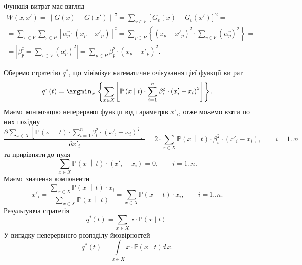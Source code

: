 Функція витрат має вигляд
\begin{equation*}
  \begin{split}
    W \left( x, x' \right)
    = \left\| G\left( x \right) - G\left( x' \right) \right\|^2
    = \sum_{v \in V} \left[
        G_v\left( x \right) - G_v\left( x' \right)
      \right]^2 = \\
    = \sum_{v \in V} \sum_{p \in P} \left[
        \alpha_p^v \cdot \left( x_p - x'_p \right)
      \right]^2
    = \sum_{p \in P} \left\{ \left( x_p - x'_p \right)^2
      \cdot \sum_{v \in V} \left( \alpha_p^v \right)^2 \right\} = \\
    = \left| \beta_p^2 = \sum_{v \in V} \left( \alpha_p^v \right)^2 \right|
    = \sum_{p \in P} \beta_p^2 \cdot \left( x_p - x'_p \right)^2.
  \end{split}
\end{equation*}

Оберемо стратегію $q^*$,
що мінімізує математичне очікування цієї функції витрат
\begin{equation*}
  q^* \left( t \right)
  = \argmin_{x'} \left\{
    \sum\limits_{x \in X} \left[
        \mathbb{P} \left( x \;\middle|\;  t \right)
        \cdot \sum_{i = 1}^n \beta_i^2 \cdot \left( x'_i - x_i \right)^2
      \right]
    \right\}.
\end{equation*}
Маємо мінімізацію неперервної функції від параметрів $x'_i$,
отже можемо взяти по них похідну
\begin{equation*}
  \frac{\partial \sum\limits_{x \in X} \left[
      \mathbb{P} \left( x \;\middle|\;  t \right)
      \cdot \sum\limits_{i = 1}^n \beta_i^2 \cdot \left( x'_i - x_i \right)^2
  \right]}{\partial x'_i}
  = 2 \cdot \sum_{x \in X} \mathbb{P} \left( x \;\middle|\;  t \right)
    \cdot \beta_i^2 \cdot \left( x'_i - x_i \right), \qquad i = 1..n
\end{equation*}
та прирівняти до нуля
\begin{equation*}
  \sum_{x \in X} \mathbb{P} \left( x \;\middle|\;  t \right)
  \cdot \left( x'_i - x_i \right) = 0, \qquad i = 1..n.
\end{equation*}
Маємо значення компоненти
\begin{equation*}
  x'_i = \frac{\sum\limits_{x \in X}
    \mathbb{P} \left( x \;\middle|\;  t \right) \cdot x_i}
    {\sum\limits_{x \in X}
      \mathbb{P} \left( x \;\middle|\;  t \right)}
  = \sum\limits_{x \in X}
    \mathbb{P} \left( x \;\middle|\;  t \right) \cdot x_i, \qquad i = 1..n.
\end{equation*}
Результуюча стратегія
\begin{equation*}
  q^*\left( t \right)
  = \sum_{x \in X} x \cdot \mathbb{P}\left( x \mid t \right).
\end{equation*}
У випадку неперервного розподілу ймовірностей
\begin{equation*}
  q^*\left( t \right)
  = \int\limits_{x \in X} x \cdot \mathbb{P}\left( x \mid t \right) d\,x.
\end{equation*}

